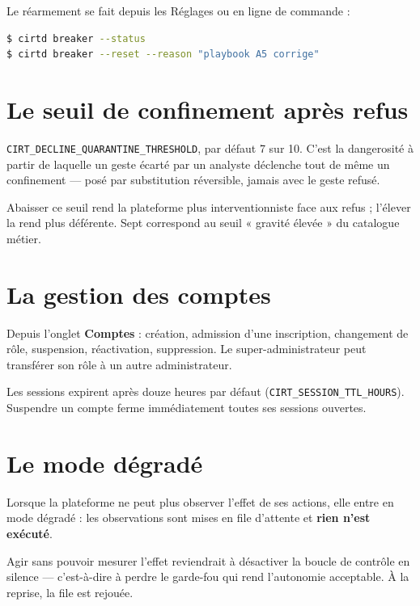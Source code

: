 Le réarmement se fait depuis les Réglages ou en ligne de commande :

\begin{lstlisting}[language=bash]
$ cirtd breaker --status
$ cirtd breaker --reset --reason "playbook A5 corrige"
\end{lstlisting}

\section{Le seuil de confinement après refus}

\texttt{CIRT\_DECLINE\_QUARANTINE\_THRESHOLD}, par défaut 7 sur 10. C'est la
dangerosité à partir de laquelle un geste écarté par un analyste déclenche tout
de même un confinement — posé par substitution réversible, jamais avec le geste
refusé.

Abaisser ce seuil rend la plateforme plus interventionniste face aux refus ;
l'élever la rend plus déférente. Sept correspond au seuil « gravité élevée » du
catalogue métier.

\section{La gestion des comptes}

Depuis l'onglet \textbf{Comptes} : création, admission d'une inscription,
changement de rôle, suspension, réactivation, suppression. Le
super-administrateur peut transférer son rôle à un autre administrateur.

\begin{tcolorbox}[colback=green!4!white, colframe=darkgreen,
  title=\textbf{Bon à savoir}, fonttitle=\bfseries, boxrule=0.6pt]
Les sessions expirent après douze heures par défaut
(\texttt{CIRT\_SESSION\_TTL\_HOURS}). Suspendre un compte ferme immédiatement
toutes ses sessions ouvertes.
\end{tcolorbox}

\section{Le mode dégradé}

Lorsque la plateforme ne peut plus observer l'effet de ses actions, elle entre
en mode dégradé : les observations sont mises en file d'attente et
\textbf{rien n'est exécuté}.

Agir sans pouvoir mesurer l'effet reviendrait à désactiver la boucle de
contrôle en silence — c'est-à-dire à perdre le garde-fou qui rend l'autonomie
acceptable. À la reprise, la file est rejouée.


